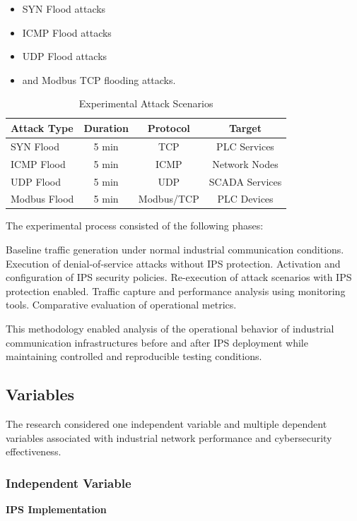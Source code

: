 \documentclass[sigconf]{acmart}
\begin{document}
\begin{itemize}
    \item SYN Flood attacks
    \item ICMP Flood attacks
    \item UDP Flood attacks
    \item and Modbus TCP flooding attacks.
\end{itemize}

\begin{table}[htbp]
\renewcommand{\tablename}{Table}
\renewcommand{\thetable}{\arabic{table}}
\captionsetup{labelsep=period,labelfont=bf,textfont=normal,
textformat=simple}
\caption{Experimental Attack Scenarios}
\label{tab:attacks}
\centering
\scriptsize
\begin{tabular}{l c c c}
\toprule
\textbf{Attack Type} & \textbf{Duration} & \textbf{Protocol} &
\textbf{Target} \\
\midrule
SYN Flood & 5 min & TCP & PLC Services \\
ICMP Flood & 5 min & ICMP & Network Nodes \\
UDP Flood & 5 min & UDP & SCADA Services \\
Modbus Flood & 5 min & Modbus/TCP & PLC Devices \\
\bottomrule
\end{tabular}
\end{table}

The experimental process consisted of the following phases:

Baseline traffic generation under normal industrial communication conditions.
Execution of denial-of-service attacks without IPS protection.
Activation and configuration of IPS security policies.
Re-execution of attack scenarios with IPS protection enabled.
Traffic capture and performance analysis using monitoring tools.
Comparative evaluation of operational metrics.

This methodology enabled analysis of the operational behavior of industrial communication infrastructures before and after IPS deployment while maintaining controlled and reproducible testing conditions.

\subsection{Variables}
The research considered one independent variable and multiple dependent variables associated with industrial network performance and cybersecurity effectiveness.

\subsubsection{Independent Variable}
\textbf{IPS Implementation}
\end{document}
